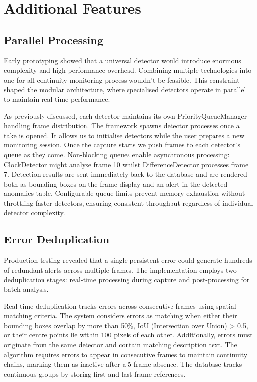 \section{Additional Features} 

\subsection{Parallel Processing}
Early prototyping showed that a universal detector would introduce enormous complexity and high performance overhead. Combining multiple technologies into one-for-all continuity monitoring process wouldn't be feasible. This constraint shaped the modular architecture, where specialised detectors operate in parallel to maintain real-time performance.

As previously discussed, each detector maintains its own PriorityQueueManager handling frame distribution. The framework spawns detector processes once a take is opened. It allows us to initialise detectors while the user prepares a new monitoring session. Once the capture starts we push frames to each detector's queue as they come. Non-blocking queues enable asynchronous processing: ClockDetector might analyse frame 10 whilst DifferenceDetector processes frame 7. Detection results are sent immediately back to the database and are rendered both as bounding boxes on the frame display and an alert in the detected anomalies table. Configurable queue limits prevent memory exhaustion without throttling faster detectors, ensuring consistent throughput regardless of individual detector complexity.

\subsection{Error Deduplication}
Production testing revealed that a single persistent error could generate hundreds of redundant alerts across multiple frames. The implementation employs two deduplication stages: real-time processing during capture and post-processing for batch analysis.

Real-time deduplication tracks errors across consecutive frames using spatial matching criteria. The system considers errors as matching when either their bounding boxes overlap by more than 50\%, IoU (Intersection over Union) > 0.5, or their centre points lie within 100 pixels of each other. Additionally, errors must originate from the same detector and contain matching description text. The algorithm requires errors to appear in consecutive frames to maintain continuity chains, marking them as inactive after a 5-frame absence. The database tracks continuous groups by storing first and last frame references. 

